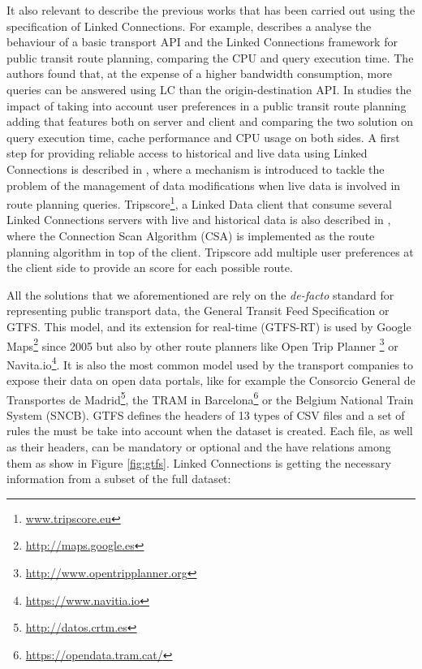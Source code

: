 \documentclass[sw]{iosart2x}
\begin{document}
It also relevant to describe the previous works that has been carried out using the specification of Linked Connections. For example, \cite{colpaert2017public} describes a analyse the behaviour of a basic transport API and the Linked Connections framework for public transit route planning, comparing the CPU and query execution time. The authors found that, at the expense of a higher bandwidth consumption, more queries can be answered using  LC than the origin-destination API. In \cite{colpaert2016impact} studies the impact of taking into account user preferences in a public transit route planning adding that features both on server and client and comparing the two solution on query execution time, cache performance and CPU usage on both sides. A first step for providing reliable access to historical and live data using Linked Connections is described in \cite{rojas2017providing}, where a mechanism is introduced to tackle the problem of the management of  data modifications when live data is involved in route planning queries. Tripscore\footnote{\url{www.tripscore.eu}}, a Linked Data client that consume several Linked Connections servers with live and historical data is also described in \cite{ChavesFragaEtAl:DeSemWeb2017}, where the Connection Scan Algorithm (CSA) is implemented as the route planning algorithm in top of the client\cite{dibbelt2013intriguingly}. Tripscore add multiple user preferences at the client side to provide an score for each possible route. 

All the solutions that we aforementioned are rely on the \textit{de-facto} standard for representing public transport data, the General Transit Feed Specification or GTFS. This model, and its extension for real-time (GTFS-RT) is used by Google Maps\footnote{\url{http://maps.google.es}} since 2005 but also by other route planners like Open Trip Planner \footnote{\url{http://www.opentripplanner.org}} or  Navita.io\footnote{\url{https://www.navitia.io}}. It is also the most common model used by the transport companies to expose their data on open data portals, like for example the Consorcio General de Transportes de Madrid\footnote{\url{http://datos.crtm.es}}, the TRAM in Barcelona\footnote{\url{https://opendata.tram.cat/}} or the Belgium National Train System (SNCB). GTFS defines the headers of 13 types of CSV files and a set of rules the must be take into account when the dataset is created. Each file, as well as their headers, can be mandatory or optional and the have relations among them as show in Figure \ref{fig:gtfs}. Linked Connections is getting the necessary information from a subset of the full dataset:
\end{document}
